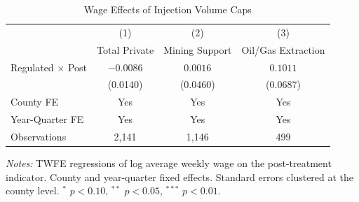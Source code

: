 \begin{table}[htbp]
\centering
\caption{Wage Effects of Injection Volume Caps}
\label{tab:wages}
\begin{threeparttable}
\begin{tabular}{lccc}
\toprule
 & (1) & (2) & (3) \\
 & Total Private & Mining Support & Oil/Gas Extraction \\
\midrule
Regulated $\times$ Post & $-0.0086$ & $0.0016$ & $0.1011$ \\
 & (0.0140) & (0.0460) & (0.0687) \\
\midrule
County FE & Yes & Yes & Yes \\
Year-Quarter FE & Yes & Yes & Yes \\
Observations & 2,141 & 1,146 & 499 \\
\bottomrule
\end{tabular}
\begin{tablenotes}[flushleft]\footnotesize
\item \textit{Notes:} TWFE regressions of log average weekly wage on the post-treatment indicator. County and year-quarter fixed effects. Standard errors clustered at the county level. $^{*}$ $p<0.10$, $^{**}$ $p<0.05$, $^{***}$ $p<0.01$.
\end{tablenotes}
\end{threeparttable}
\end{table}

